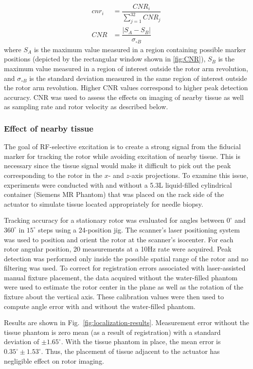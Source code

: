 \documentclass[journal]{IEEEtran}
\newcommand{\abs}[1]{\lvert#1\rvert}
\begin{document}
\begin{align}
    cnr_i &= \dfrac{CNR_i}{\sum_{j=1}^{32} CNR_j} \nonumber\\
    CNR &= \dfrac{\abs{S_{A}-S_{B}}}{\sigma_{\circ B}}
\label{eq:CNR}
\end{align}
where $S_{A}$ is the maximum value measured in a region containing possible marker positions (depicted by the rectangular window shown in \ref{fig:CNR}), $S_{B}$ is the maximum value measured in a region of interest outside the rotor arm revolution, and $\sigma_{\circ B}$ is the standard deviation measured in the same region of interest outside the rotor arm revolution. Higher CNR values correspond to higher peak detection accuracy. CNR was used to assess the effects on imaging of nearby tissue as well as sampling rate and rotor velocity as described below.

\subsubsection{Effect of nearby tissue}\label{subsubsec:ExpNonwMovingTrackingWithPhantom}
The goal of RF-selective excitation is to create a strong signal from the fiducial marker for tracking the rotor while avoiding excitation of nearby tissue. This is necessary since the tissue signal would make it difficult to pick out the peak corresponding to the rotor in the $x$- and $z$-axis projections. To examine this issue, experiments were conducted with and without a 5.3L liquid-filled cylindrical container (Siemens MR Phantom) that was placed on the rack side of the actuator to simulate tissue located appropriately for needle biopsy.

Tracking accuracy for a stationary rotor was evaluated for angles between $0^\circ$ and $360^\circ$ in $15^\circ$ steps using a 24-position jig. The scanner's laser positioning system was used to position and orient the rotor at the scanner's isocenter. For each rotor angular position, 20 measurements at a 10Hz rate were acquired. Peak detection was performed only inside the possible spatial range of the rotor and no filtering was used. To correct for registration errors associated with laser-assisted manual fixture placement, the data acquired without the water-filled phantom were used to estimate the rotor center in the plane as well as the rotation of the fixture about the vertical axis. These calibration values were then used to compute angle error with and without the water-filled phantom. 

Results are shown in Fig.\ \ref{fig:localization-results}. Measurement error without the tissue phantom is zero mean (as a result of registration) with a standard deviation of $\pm1.65^\circ$. With the tissue phantom in place, the mean error is $0.35^\circ \pm 1.53^\circ$. Thus, the placement of tissue adjacent to the actuator has negligible effect on rotor imaging. 
\end{document}
